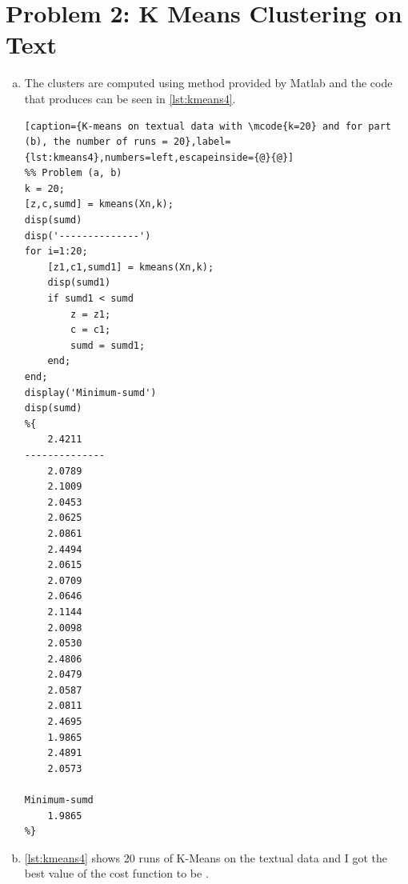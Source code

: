 \documentclass[a4paper, 11pt]{article}
\begin{document}
\section*{Problem 2: K Means Clustering on Text}
\begin{enumerate}[(a)]
\item The clusters are computed using  method provided by Matlab and the code that produces can be seen in \autoref{lst:kmeans4}.
\vspace{-20pt}
\begin{lstlisting}[caption={K-means on textual data with \mcode{k=20} and for part (b), the number of runs = 20},label={lst:kmeans4},numbers=left,escapeinside={@}{@}]
%% Problem (a, b)
k = 20;
[z,c,sumd] = kmeans(Xn,k);
disp(sumd)
disp('--------------')
for i=1:20;
    [z1,c1,sumd1] = kmeans(Xn,k);
    disp(sumd1)
    if sumd1 < sumd
        z = z1;
        c = c1;
        sumd = sumd1;
    end;
end;
display('Minimum-sumd')
disp(sumd)
%{
    2.4211
--------------
    2.0789
    2.1009
    2.0453
    2.0625
    2.0861
    2.4494
    2.0615
    2.0709
    2.0646
    2.1144
    2.0098
    2.0530
    2.4806
    2.0479
    2.0587
    2.0811
    2.4695
    1.9865
    2.4891
    2.0573

Minimum-sumd
    1.9865
%}
\end{lstlisting}
\item \autoref{lst:kmeans4} shows 20 runs of K-Means on the textual data and I got the best value of the cost function to be .


\end{enumerate}
\end{document}
